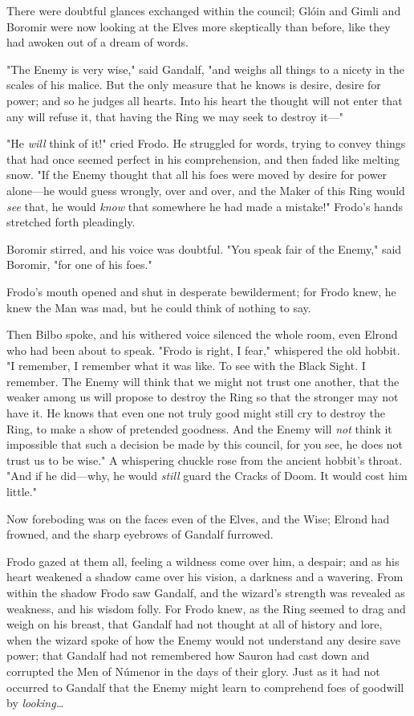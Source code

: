 There were doubtful glances exchanged within the council; Glóin and Gimli and 
Boromir were now looking at the Elves more skeptically than before, like they 
had awoken out of a dream of words.

"The Enemy is very wise," said Gandalf, "and weighs all things to a nicety in 
the scales of his malice. But the only measure that he knows is desire, desire 
for power; and so he judges all hearts. Into his heart the thought will not 
enter that any will refuse it, that having the Ring we may seek to destroy 
it---"

"He \emph{will} think of it!" cried Frodo. He struggled for words, trying to 
convey things that had once seemed perfect in his comprehension, and then faded 
like melting snow. "If the Enemy thought that all his foes were moved by desire 
for power alone---he would guess wrongly, over and over, and the Maker of this 
Ring would \emph{see} that, he would \emph{know} that somewhere he had made a 
mistake!" Frodo's hands stretched forth pleadingly.

Boromir stirred, and his voice was doubtful. "You speak fair of the Enemy," 
said Boromir, "for one of his foes."

Frodo's mouth opened and shut in desperate bewilderment; for Frodo knew, he 
knew the Man was mad, but he could think of nothing to say.

Then Bilbo spoke, and his withered voice silenced the whole room, even Elrond 
who had been about to speak. "Frodo is right, I fear," whispered the old 
hobbit. "I remember, I remember what it was like. To see with the Black Sight. 
I remember. The Enemy will think that we might not trust one another, that the 
weaker among us will propose to destroy the Ring so that the stronger may not 
have it. He knows that even one not truly good might still cry to destroy the 
Ring, to make a show of pretended goodness. And the Enemy will \emph{not} think 
it impossible that such a decision be made by this council, for you see, he 
does not trust us to be wise." A whispering chuckle rose from the ancient 
hobbit's throat. "And if he did---why, he would \emph{still} guard the Cracks 
of Doom. It would cost him little."

Now foreboding was on the faces even of the Elves, and the Wise; Elrond had 
frowned, and the sharp eyebrows of Gandalf furrowed.

Frodo gazed at them all, feeling a wildness come over him, a despair; and as 
his heart weakened a shadow came over his vision, a darkness and a wavering. 
From within the shadow Frodo saw Gandalf, and the wizard's strength was 
revealed as weakness, and his wisdom folly. For Frodo knew, as the Ring seemed 
to drag and weigh on his breast, that Gandalf had not thought at all of history 
and lore, when the wizard spoke of how the Enemy would not understand any 
desire save power; that Gandalf had not remembered how Sauron had cast down and 
corrupted the Men of Númenor in the days of their glory. Just as it had not 
occurred to Gandalf that the Enemy might learn to comprehend foes of goodwill 
by \emph{looking{\ldots}}

